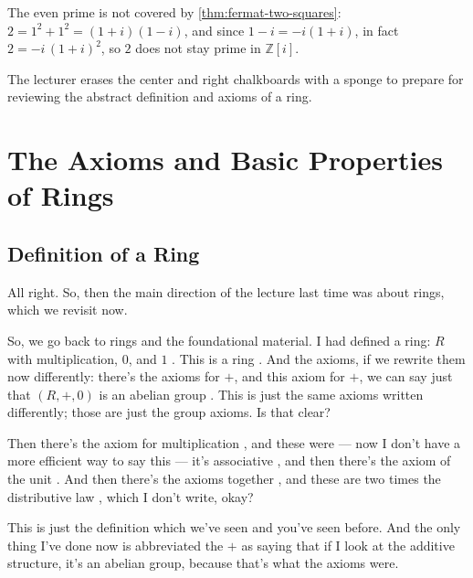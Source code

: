 \begin{aiNote}
The even prime is not covered by \cref{thm:fermat-two-squares}: $2 = 1^2 + 1^2 = (1 + i)(1 - i)$, and since $1 - i = -i(1 + i)$, in fact $2 = -i \, (1 + i)^2$, so $2$ does not stay prime in $\mathbb{Z}[i]$.
\end{aiNote}

\begin{note}
The lecturer erases the center and right chalkboards with a sponge to prepare for reviewing the abstract definition and axioms of a ring.
\end{note}

\begin{hidden}
\end{hidden}

\section{The Axioms and Basic Properties of Rings}
\subsection{Definition of a Ring}

\begin{speech}[00:08:15 - 00:09:45]
All right. So, then the main direction of the lecture last time was about rings, which we revisit now.

So, we go back to rings and the foundational material. I had defined a ring: $R$ with multiplication, $0$, and $1$ . This is a ring . And the axioms, if we rewrite them now differently: there's the axioms for $+$, and this axiom for $+$, we can say just that $(R, +, 0)$ is an abelian group . This is just the same axioms written differently; those are just the group axioms. Is that clear?

Then there's the axiom for multiplication , and these were --- now I don't have a more efficient way to say this --- it's associative , and then there's the axiom of the unit . And then there's the axioms together , and these are two times the distributive law , which I don't write, okay?

This is just the definition which we've seen and you've seen before. And the only thing I've done now is abbreviated the $+$ as saying that if I look at the additive structure, it's an abelian group, because that's what the axioms were.
\end{speech}

